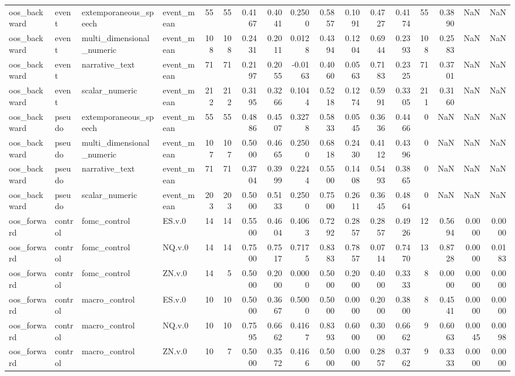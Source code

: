 \begin{tabular}{llllrrrrrrrrrrrrr}
oos_backward & event & extemporaneous_speech & event_mean & 55 & 55 & 0.4167 & 0.4041 & 0.2500 & 0.5857 & 0.1091 & 0.4727 & 0.4174 & 55 & 0.3890 & NaN & NaN \\
oos_backward & event & multi_dimensional_numeric & event_mean & 108 & 108 & 0.2431 & 0.2011 & 0.0128 & 0.4394 & 0.1204 & 0.6944 & 0.2393 & 108 & 0.2583 & NaN & NaN \\
oos_backward & event & narrative_text & event_mean & 71 & 71 & 0.2197 & 0.2055 & -0.0163 & 0.4060 & 0.0563 & 0.7183 & 0.2325 & 71 & 0.3701 & NaN & NaN \\
oos_backward & event & scalar_numeric & event_mean & 212 & 212 & 0.3195 & 0.3266 & 0.1044 & 0.5218 & 0.1274 & 0.5991 & 0.3305 & 211 & 0.3160 & NaN & NaN \\
oos_backward & pseudo & extemporaneous_speech & event_mean & 55 & 55 & 0.4886 & 0.4507 & 0.3278 & 0.5833 & 0.0545 & 0.3636 & 0.4466 & 0 & NaN & NaN & NaN \\
oos_backward & pseudo & multi_dimensional_numeric & event_mean & 107 & 107 & 0.5000 & 0.4665 & 0.2500 & 0.6818 & 0.2430 & 0.4112 & 0.4396 & 0 & NaN & NaN & NaN \\
oos_backward & pseudo & narrative_text & event_mean & 71 & 71 & 0.3704 & 0.3999 & 0.2244 & 0.5500 & 0.1408 & 0.5493 & 0.3865 & 0 & NaN & NaN & NaN \\
oos_backward & pseudo & scalar_numeric & event_mean & 203 & 203 & 0.5000 & 0.5133 & 0.2500 & 0.7500 & 0.2611 & 0.3645 & 0.4864 & 0 & NaN & NaN & NaN \\
oos_forward & control & fomc_control & ES.v.0 & 14 & 14 & 0.5500 & 0.4604 & 0.4063 & 0.7292 & 0.2857 & 0.2857 & 0.4926 & 12 & 0.5694 & 0.0000 & 0.0000 \\
oos_forward & control & fomc_control & NQ.v.0 & 14 & 14 & 0.7500 & 0.7517 & 0.7175 & 0.8383 & 0.7857 & 0.0714 & 0.7470 & 13 & 0.8728 & 0.0000 & 0.0183 \\
oos_forward & control & fomc_control & ZN.v.0 & 14 & 5 & 0.5000 & 0.2000 & 0.0000 & 0.5000 & 0.2000 & 0.4000 & 0.3333 & 8 & 0.0000 & 0.0000 & 0.0000 \\
oos_forward & control & macro_control & ES.v.0 & 10 & 10 & 0.5000 & 0.3667 & 0.5000 & 0.5000 & 0.0000 & 0.2000 & 0.3800 & 8 & 0.4541 & 0.0000 & 0.0000 \\
oos_forward & control & macro_control & NQ.v.0 & 10 & 10 & 0.7595 & 0.6662 & 0.4167 & 0.8393 & 0.6000 & 0.3000 & 0.6662 & 9 & 0.6063 & 0.0045 & 0.0098 \\
oos_forward & control & macro_control & ZN.v.0 & 10 & 7 & 0.5000 & 0.3572 & 0.4166 & 0.5000 & 0.0000 & 0.2857 & 0.3762 & 9 & 0.3333 & 0.0000 & 0.0000 \\

\end{tabular}
